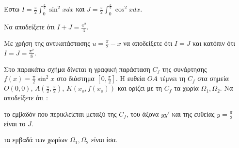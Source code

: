 \begin{figure}
\end{figure}
Έστω $I = \frac{\pi}{2} \int_0^{\frac{\pi}{2}} \sin^2 x dx$ και $J = \frac{\pi}{2} \int_0^{\frac{\pi}{2}} \cos^2 x dx$.

\begin{alist}
    \item Να αποδείξετε ότι $I+J = \frac{\pi^2}{4}$. 
    \item Με χρήση της αντικατάστασης $u = \frac{\pi}{2} - x$ να αποδείξετε ότι $I=J$ και κατόπιν ότι $I=J=\frac{\pi^2}{8}$. 
    \item Στο παρακάτω σχήμα δίνεται η γραφική παράσταση $C_f$ της συνάρτησης $f(x) = \frac{\pi}{2} \sin^2 x$ στο διάστημα $\left[0, \frac{\pi}{2}\right]$. Η ευθεία $OA$ τέμνει τη $C_f$ στα σημεία $O(0,0)$, $A\left(\frac{\pi}{2}, \frac{\pi}{2}\right)$, $K(x_o, f(x_o))$ και ορίζει με τη $C_f$ τα χωρία $\Omega_1, \Omega_2$. Να αποδείξετε ότι :
    \begin{rlist}
        \item το εμβαδόν που περικλείεται μεταξύ της $C_f$, του άξονα $yy'$ και της ευθείας $y=\frac{\pi}{2}$ είναι το $J$. 
        \item τα εμβαδά των χωρίων $\Omega_1, \Omega_2$ είναι ίσα. 
    \end{rlist}
\end{alist}